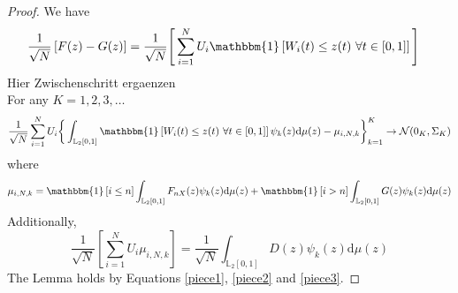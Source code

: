 \documentclass[12pt, a4paper]{article}
\theoremstyle{MAstyle} \newtheorem{assumption}{Assumption}[section]
\theoremstyle{MAstyle} \newtheorem{definition}{Definition}[section]
\theoremstyle{MAstyle} \newtheorem{theorem}{Theorem}[section]
\begin{document}
			\begin{proof}
				We have
				\begin{equation}\label{piece1}
					\begin{split}
						\frac{1}{\sqrt{N}}\left[F(z) - G(z)\right] &= \frac{1}{\sqrt{N}} \Bigg[ \sum_{i = 1}^{N} U_i \mathbbm{1}\left[W_i(t) \leq z(t) \ \forall t \in [0,1]\right] \Bigg]
					\end{split}
				\end{equation}
				{\color{red} Hier Zwischenschritt ergaenzen}\\
				For any $K = 1,2,3,\dots$
				\begin{equation}\label{piece2}
						\frac{1}{\sqrt{N}} \sum_{i = 1}^{N} U_i \bigg\{ \int_{\mathbb{L}_2[0,1]} \mathbbm{1}\left[W_i(t) \leq z(t) \ \forall t \in [0,1] \right] \psi_k(z) \mathrm{d} \mu(z) - \mu_{i,N,k}\bigg\}_{k = 1}^K  \rightarrow \mathcal{N}(0_K, \Sigma_K)
				\end{equation}
				where
				\begin{equation}
					\mu_{i,N,k} = \mathbbm{1}\left[i \leq n\right] \int_{\mathbb{L}_2[0,1]} F_{nX}(z) \psi_k(z) \mathrm{d} \mu(z) + 
					\mathbbm{1}\left[i > n\right] \int_{\mathbb{L}_2[0,1]} G(z) \psi_k(z) \mathrm{d} \mu(z)
				\end{equation}
				Additionally,
				\begin{equation}\label{piece3}
					\frac{1}{\sqrt{N}} \left[ \sum_{i = 1}^{N} U_i \mu_{i,N,k}\right] = \frac{1}{\sqrt{N}} \int_{\mathbb{L}_2[0,1]} D(z) \psi_k(z) \mathrm{d}\mu(z)
				\end{equation}
				The Lemma holds by Equations \ref{piece1}, \ref{piece2} and \ref{piece3}.
			\end{proof}
		
\end{document}
